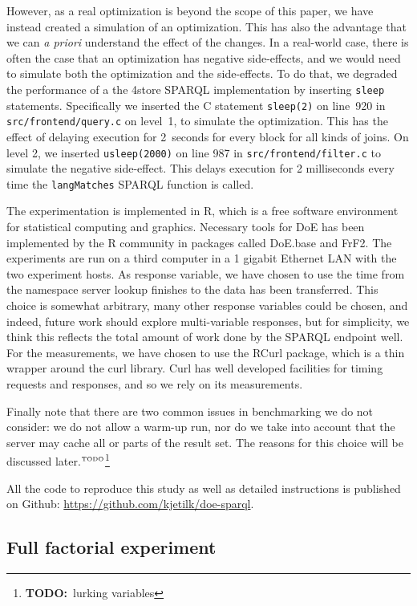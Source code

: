 \documentclass{llncs}
\newcommand{\todo}[1]{\ensuremath{^{\textrm{\tiny{TODO}\normalsize}}}\footnote{\textbf{TODO:}~#1}}
\begin{document}
However, as a real optimization is beyond the scope of this paper, we
have instead created a simulation of an optimization. This has also
the advantage that we can \textit{a priori} understand the effect of
the changes. In a real-world case, there is often the case that an
optimization has negative side-effects, and we would need to simulate
both the optimization and the side-effects. To do that, we degraded
the performance of a the 4store SPARQL implementation by inserting
\texttt{sleep} statements. Specifically we inserted the C statement
\texttt{sleep(2)} on line~920 in \texttt{src/frontend/query.c} on
level~1, to simulate the optimization. This has the effect of delaying
execution for 2~seconds for every block for all kinds of joins. On
level 2, we inserted \texttt{usleep(2000)} on line 987 in
\texttt{src/frontend/filter.c} to simulate the negative
side-effect. This delays execution for 2 milliseconds every time the
\texttt{langMatches} SPARQL function is called.

The experimentation is implemented in R\cite{rmanual}, which is a free
software environment for statistical computing and graphics. Necessary
tools for DoE has been implemented by the R community in packages
called DoE.base\cite{doebase} and FrF2\cite{frf2}. The experiments are run on a third
computer in a 1 gigabit Ethernet LAN with the two experiment hosts.  As
response variable, we have chosen to use the time from the namespace
server lookup finishes to the data has been transferred. This choice is
somewhat arbitrary, many other response variables could be chosen, and
indeed, future work should explore multi-variable responses, but for
simplicity, we think this reflects the total amount of work done by
the SPARQL endpoint well. For the measurements, we have chosen to use
the RCurl package\cite{lang2007r}, which is a thin wrapper around the curl
library. Curl has well developed facilities for timing requests and
responses, and so we rely on its measurements.

Finally note that there are two common issues in benchmarking we do
not consider: we do not allow a warm-up run, nor do we take into
account that the server may cache all or parts of the result set. The
reasons for this choice will be discussed later.\todo{lurking
  variables}

All the code to reproduce this study as well as detailed instructions
is published on Github: \url{https://github.com/kjetilk/doe-sparql}.

\subsection{Full factorial experiment}
\end{document}
